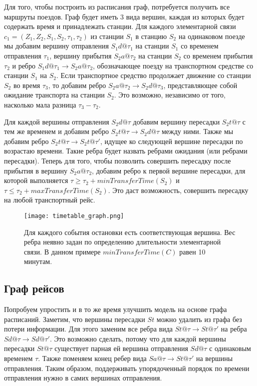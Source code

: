 Для того, чтобы построить из расписания граф, потребуется получить все маршруты поездов. Граф будет иметь 3 вида вершин, каждая из которых будет содержать время и принадлежать станции. Для каждого элементарной связи $c_1=(Z_1, Z_2, S_1, S_2, \tau_1, \tau_2)$ из станции $S_1$ в станцию $S_2$ на одинаковом поезде мы добавим вершину отправления $S_1d@\tau_1$ на станции $S_1$ со временем отправления $\tau_1$, вершину прибытия $S_2a@\tau_2$ на станции $S_2$ со временем прибытия $\tau_2$ и ребро $S_1d@\tau_1 \rightarrow S_2a@\tau_2$, обозначающее поезду на транспортном средстве со станции $S_1$ на $S_2$. Если транспортное средство продолжает движение со станции $S_2$ во время $\tau_3$, то добавим ребро $S_2a@\tau_2 \rightarrow S_2d@\tau_3$, представляющее собой ожидание транспорта на станции $S_2$. Это возможно, независимо от того, насколько мала разница $\tau_3-\tau_2$.

Для каждой вершины отправления $S_2d@\tau$ добавим вершину пересадки $S_2t@\tau$ с тем же временем и добавим ребро $S_2t@\tau \rightarrow S_2d@\tau$ между ними. Также мы добавим ребро $S_2t@\tau \rightarrow S_2t@\tau'$, идущее ко следующей вершине пересадки по возрастаю времени. Такие ребра будет назвать ребрами ожидания (или ребрами пересадки). Теперь для того, чтобы позволить совершить пересадку после прибытия в вершину $S_2a@\tau_2$, добавим ребро к первой вершине пересадки, для которой выполняется $\tau \geqslant \tau_2 + minTransferTime(S_2)$ и $\tau \leqslant \tau_2 + maxTransferTime(S_2)$. Это даст возможность, совершить пересадку на любой транспортный рейс.
 
\begin{figure}[!h]
	\centering
	\texttt{[image: timetable\_graph.png]}
	\caption{Для каждого события остановки есть соответствующая вершина. Вес ребра неявно задан по определению длительности элементарной связи. В данном примере $minTransferTime(C)$ равен 10 минутам.}\label{fig4}
\end{figure}
\FloatBarrier 
 
\subsection{Граф рейсов}
Попробуем упростить и в то же время улучшить модель на основе графа расписаний. Заметим, что вершины пересадки $St$ можно удалить из графа без потери информации. Для этого заменим все ребра вида $St@\tau \rightarrow St@\tau'$ на ребра $Sd@\tau \rightarrow Sd@\tau'$. Это возможно сделать, потому что для каждой вершины пересадки $St@\tau$ существует парная ей вершина отправления $Sd@\tau$ с одинаковым временем $\tau$. Также поменяем конец ребер вида $Sa@\tau \rightarrow St@\tau'$ на вершины отправления. Таким образом, поддерживать упорядоченный порядок по времени отправления нужно в самих вершинах отправления.

